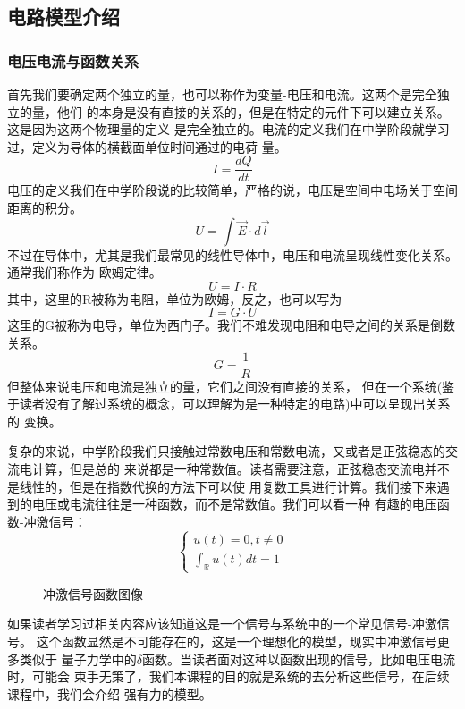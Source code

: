 \documentclass{article}
\numberwithin{figure}{subsection} %
\begin{document}
    \subsection{电路模型介绍}

    \subsubsection{电压电流与函数关系}
    首先我们要确定两个独立的量，也可以称作为变量-电压和电流。这两个是完全独立的量，他们
    的本身是没有直接的关系的，但是在特定的元件下可以建立关系。这是因为这两个物理量的定义
    是完全独立的。电流的定义我们在中学阶段就学习过，定义为导体的横截面单位时间通过的电荷
    量。$$ I = \frac{dQ}{dt} $$
    电压的定义我们在中学阶段说的比较简单，严格的说，电压是空间中电场关于空间距离的积分。
    $$ U = \int \vec{E} \cdot d\vec{l} $$
    不过在导体中，尤其是我们最常见的线性导体中，电压和电流呈现线性变化关系。通常我们称作为
    欧姆定律。$$ U = I \cdot R $$
    其中，这里的R被称为电阻，单位为欧姆，反之，也可以写为$$ I = G \cdot U $$
    这里的G被称为电导，单位为西门子。我们不难发现电阻和电导之间的关系是倒数关系。
    $$ G = \frac{1}{R} $$
    但整体来说电压和电流是独立的量，它们之间没有直接的关系，
    但在一个系统(鉴于读者没有了解过系统的概念，可以理解为是一种特定的电路)中可以呈现出关系的
    变换。

    复杂的来说，中学阶段我们只接触过常数电压和常数电流，又或者是正弦稳态的交流电计算，但是总的
    来说都是一种常数值。读者需要注意，正弦稳态交流电并不是线性的，但是在指数代换的方法下可以使
    用复数工具进行计算。我们接下来遇到的电压或电流往往是一种函数，而不是常数值。我们可以看一种
    有趣的电压函数-冲激信号：
    $$
    \left\{
    \begin{aligned}
        u(t) = 0, t \neq 0 \\
        \int_{\mathbb{R}}  u(t) dt = 1
    \end{aligned}
    \right.
    $$

    \begin{figure}[htbp]
    \centering
    \caption{冲激信号函数图像}
    \end{figure}
    如果读者学习过相关内容应该知道这是一个信号与系统中的一个常见信号-冲激信号。
    这个函数显然是不可能存在的，这是一个理想化的模型，现实中冲激信号更多类似于
    量子力学中的$\delta$函数。当读者面对这种以函数出现的信号，比如电压电流时，可能会
    束手无策了，我们本课程的目的就是系统的去分析这些信号，在后续课程中，我们会介绍
    强有力的模型。
    
\end{document}
